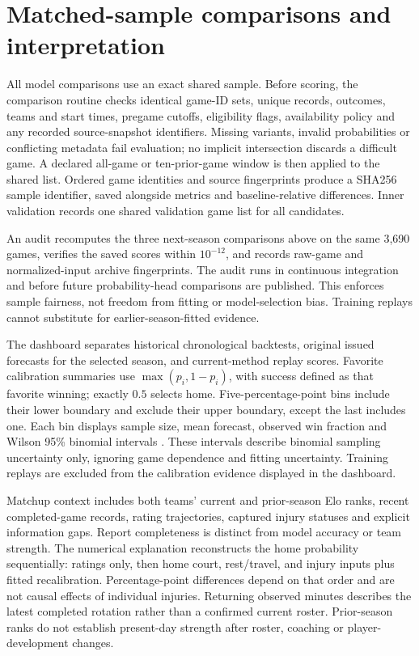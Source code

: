 \documentclass[11pt]{article}
\begin{document}
\section{Matched-sample comparisons and interpretation}
All model comparisons use an exact shared sample. Before scoring, the
comparison routine checks identical game-ID sets, unique records, outcomes,
teams and start times, pregame cutoffs, eligibility flags, availability
policy and any recorded source-snapshot identifiers. Missing variants,
invalid probabilities or conflicting metadata fail evaluation; no implicit
intersection discards a difficult game. A declared all-game or ten-prior-game
window is then applied to the shared list. Ordered game identities and
source fingerprints produce a SHA256 sample identifier, saved alongside
metrics and baseline-relative differences. Inner validation records one
shared validation game list for all candidates.

An audit recomputes the three next-season comparisons above on the same
3,690 games, verifies the saved scores within $10^{-12}$, and records raw-game
and normalized-input archive fingerprints. The audit runs in continuous
integration and before future probability-head comparisons are published.
This enforces sample fairness, not freedom from fitting or model-selection
bias. Training replays cannot substitute for earlier-season-fitted evidence.

The dashboard separates historical chronological backtests, original
issued forecasts for the selected season, and current-method replay scores.
Favorite calibration summaries use $\max(p_i,1-p_i)$, with success defined
as that favorite winning; exactly $0.5$ selects home. Five-percentage-point
bins include their lower boundary and exclude their upper boundary, except
the last includes one. Each bin displays sample size, mean forecast,
observed win fraction and Wilson 95\% binomial intervals \cite{wilson}.
These intervals describe binomial sampling uncertainty only, ignoring game
dependence and fitting uncertainty. Training replays are excluded from the
calibration evidence displayed in the dashboard.

Matchup context includes both teams' current and prior-season Elo ranks,
recent completed-game records, rating trajectories, captured injury statuses
and explicit information gaps. Report completeness is distinct from model
accuracy or team strength. The numerical explanation reconstructs the home
probability sequentially: ratings only, then home court, rest/travel, and
injury inputs plus fitted recalibration. Percentage-point differences depend
on that order and are not causal effects of individual injuries. Returning
observed minutes describes the latest completed rotation rather than a
confirmed current roster. Prior-season ranks do not establish present-day
strength after roster, coaching or player-development changes.
\end{document}
